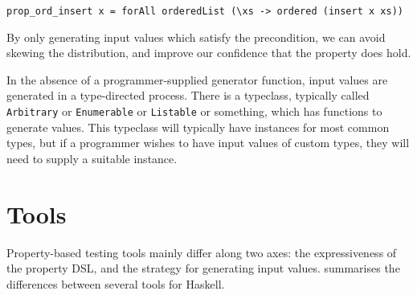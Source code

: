 \begin{verbatim}
prop_ord_insert x = forAll orderedList (\xs -> ordered (insert x xs))
\end{verbatim}

By only generating input values which satisfy the precondition, we can avoid
skewing the distribution, and improve our confidence that the property does
hold.

In the absence of a programmer-supplied generator function, input values are
generated in a type-directed process.  There is a typeclass, typically called
\verb|Arbitrary| or \verb|Enumerable| or \verb|Listable| or something, which has
functions to generate values.  This typeclass will typically have instances for
most common types, but if a programmer wishes to have input values of custom
types, they will need to supply a suitable instance.

\section{Tools}
\label{sec:property_testing-tools}

Property-based testing tools mainly differ along two axes: the
expressiveness of the property DSL, and the strategy for generating
input values.  summarises the differences between
several tools for Haskell.

\begingroup
\newcommand{\Y}{\CIRCLE}
\newcommand{\N}{\Circle}
\newcommand{\YN}{\LEFTcircle}
\newcommand{\Q}{\N$^p$}
\newcommand{\VBS}{\rotatebox{90}{\scriptsize BSD3}}
\newcommand{\VGP}{\rotatebox{90}{\scriptsize GPLv3}}


